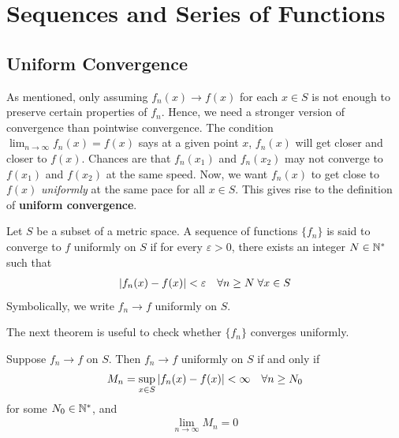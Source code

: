 \documentclass[thmcnt=section, 12pt]{my-elegantbook}
\begin{document}

\chapter{Sequences and Series of Functions}


\section{Uniform Convergence}

As mentioned, only assuming $f_n(x) \to f(x)$ for each $x \in S$ is not enough to preserve certain properties of $f_n$. Hence, we need a stronger version of convergence than pointwise convergence. The condition $\lim_{n \to \infty} f_n(x) = f(x)$ says at a given point $x$, $f_n(x)$ will get closer and closer to $f(x)$. Chances are that $f_n(x_1)$ and $f_n(x_2)$ may not converge to $f(x_1)$ and $f(x_2)$ at the same speed. Now, we want $f_n(x)$ to get close to $f(x)$ \textit{uniformly} at the same pace for all $x \in S$. This gives rise to the definition of \textbf{uniform convergence}.

\begin{definition}
    Let $S$ be a subset of a metric space. A sequence of functions $\{f_n\}$ is said to converge to $f$ uniformly on $S$ if for every $\varepsilon > 0$, there exists an integer $N \in \mathbb{N}^\ast$ such that 
    \begin{align*}
        \left\lvert f_n(x) - f(x) \right\rvert < \varepsilon
        \quad \forall n \geq N \;
        \forall x \in S
    \end{align*}
    Symbolically, we write $f_n \to f$ uniformly on $S$.
\end{definition}


The next theorem is useful to check whether $\{f_n\}$ converges uniformly.

\begin{theorem} \label{thm:46}
    Suppose $f_n \to f$ on $S$. Then $f_n \to f$ uniformly on $S$ if and only if
    \begin{align*}
        M_n = \sup_{x \in S} \left\lvert f_n(x) - f(x) \right\rvert < \infty
        \quad \forall n \geq N_0
    \end{align*}
    for some $N_0 \in \mathbb{N}^\ast$, and 
    \begin{align*}
        \lim_{n \to \infty} M_n = 0
    \end{align*}
\end{theorem}
\end{document}
